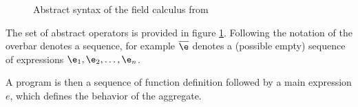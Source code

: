 \begin{figure}[t]
\centering
\centerline{
}
\caption{Abstract syntax of the field calculus from \cite{FieldCalculus, Share}} \label{fig:fcsyntax}
\end{figure}

The set of abstract operators is provided in figure \ref{fig:fcsyntax}. Following the notation of \cite{FeatherJava} the overbar denotes a sequence, for example $\overline{\e}$  denotes a (possible empty) sequence of expressions $\e_1, \e_2, \dots, \e_n$.

A program is then a sequence of function definition followed by a main expression $e$, which defines the behavior of the aggregate. 

